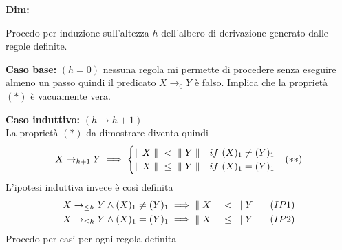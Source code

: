 \textbf{Dim:}\newline

Procedo per induzione sull'altezza $h$ dell'albero di derivazione generato dalle
regole definite.\newline

\textbf{Caso base:} $(h = 0)$ nessuna regola mi permette di procedere
senza eseguire almeno un passo quindi il predicato $X \to_0 Y$ è falso.
Implica che la proprietà $(*)$ è vacuamente vera.\newline

\textbf{Caso induttivo:} $(h \to h+1)$\\
La proprietà $(*)$ da dimostrare diventa quindi
\begin{align*}
  X \to_{h+1} Y \implies
  \begin{cases}
   {\parallel X\parallel}\ <\ {\parallel Y\parallel} &if\ (X)_1 \neq (Y)_1\\
   {\parallel X\parallel}\ \leq\ {\parallel Y\parallel} &if\ (X)_1 = (Y)_1
  \end{cases}
  && (**)
\end{align*}
L'ipotesi induttiva invece è così definita
\begin{align*}
  X \to_{\leq h} Y \land (X)_1 \neq (Y)_1 \implies \req{X}\ <\ \req{Y} &&(IP1)\\
  X \to_{\leq h} Y \land (X)_1 = (Y)_1 \implies \req{X}\ \leq\ \req{Y} &&(IP2)
\end{align*}
Procedo per casi per ogni regola definita
